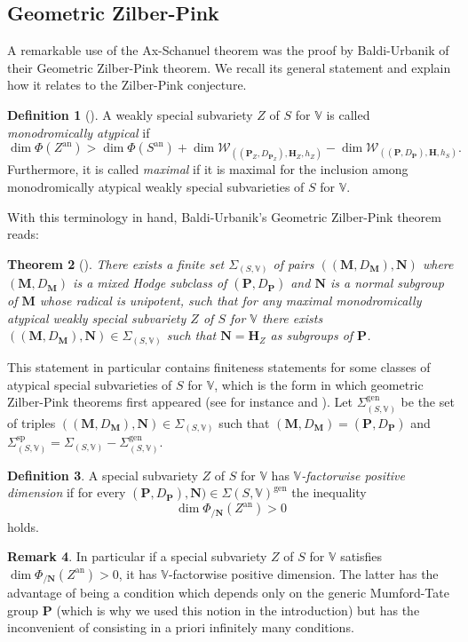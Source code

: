 \documentclass[10pt]{article}
\numberwithin{equation}{subsection}
\theoremstyle{plain}
\newtheorem{theorem}{Theorem}[section]
\theoremstyle{definition}
\newtheorem{definition}[theorem]{Definition}
\newtheorem{remark}[theorem]{Remark}
\theoremstyle{remark}
\newcommand{\V}{\mathbb V}
\newcommand{\pp}{\mathbf P}
\newcommand{\mon}{\mathbf H}
\newcommand{\M}{\mathbf M}
\newcommand{\NN}{\mathbf N}
\newcommand{\an}{\mathrm{an}}
\begin{document}
\subsection{Geometric Zilber-Pink}
A remarkable use of the Ax-Schanuel theorem was the proof by Baldi-Urbanik of their Geometric Zilber-Pink theorem. We recall its general statement and explain how it relates to the Zilber-Pink conjecture.
\begin{definition}[{\cite{bu}}]\label{monodratyp}
A weakly special subvariety $Z$ of $S$ for $\V$ is called \textit{monodromically atypical} if
\[
\dim \Phi(Z^\an) > \dim \Phi(S^\an) + \dim \mathscr{W}_{((\pp_Z, D_{\pp_Z}), \mon_Z, h_Z)} - \dim \mathscr{W}_{((\pp, D_\pp), \mon, h_S)}.
\]
Furthermore, it is called \textit{maximal} if it is maximal for the inclusion among monodromically atypical weakly special subvarieties of $S$ for $\V$.
\end{definition}
With this terminology in hand, Baldi-Urbanik's Geometric Zilber-Pink theorem reads:
\begin{theorem}[{\cite{bu}}]\label{geozp}
There exists a finite set $\Sigma_{(S,\V)}$ of pairs $((\M, D_\M), \NN)$ where $(\M, D_\M)$ is a mixed Hodge subclass of $(\pp, D_\pp)$ and $\NN$ is a normal subgroup of $\M$ whose radical is unipotent, such that for any maximal monodromically atypical weakly special subvariety $Z$ of $S$ for $\V$ there exists $((\M, D_\M), \NN) \in \Sigma_{(S, \V)}$ such that $\NN = \mon_Z$ as subgroups of $\pp$.
\end{theorem}
This statement in particular contains finiteness statements for some classes of atypical special subvarieties of $S$ for $\V$, which is the form in which geometric Zilber-Pink theorems first appeared (see for instance \cite[Thm. 1.3]{axlindul} and \cite[Thm. 3.1]{bku}). Let $\Sigma_{(S,\V)}^\mathrm{gen}$ be the set of triples $((\M, D_\M) , \NN) \in \Sigma_{(S, \V)}$ such that $(\M, D_\M) = (\pp, D_\pp)$ and $\Sigma_{(S, \V)}^\mathrm{sp} = \Sigma_{(S,\V)} - \Sigma_{(S,\V)}^\mathrm{gen}$.
\begin{definition}
A special subvariety $Z$ of $S$ for $\V$ has \textit{$\V$-factorwise positive dimension} if for every $(\pp, D_\pp), \NN) \in \Sigma{(S, \V)}^\mathrm{gen}$ the inequality
\[
\dim \Phi_{/\NN}(Z^\an) > 0
\]
holds. 
\end{definition}
\begin{remark}\label{finposdim}
In particular if a special subvariety $Z$ of $S$ for $\V$ satisfies $\dim \Phi_{/\NN}(Z^\an) > 0$, it has $\V$-factorwise positive dimension. The latter has the advantage of being a condition which depends only on the generic Mumford-Tate group $\pp$ (which is why we used this notion in the introduction) but has the inconvenient of consisting in a priori infinitely many conditions.
\end{remark}
\end{document}
